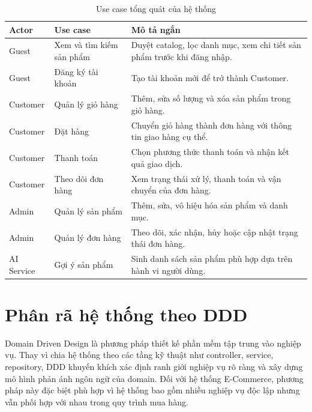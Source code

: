 \documentclass[../main.tex]{subfiles}
\begin{document}
\begin{table}[H]
    \centering
    \caption{Use case tổng quát của hệ thống}
    \label{tab:chapter2-use-cases}
    \begin{tabular}{|p{}|p{}|p{}|}
        \hline
        \rowcolor{primary!35}
        \textbf{Actor} & \textbf{Use case} & \textbf{Mô tả ngắn} \\
        \hline
        Guest & Xem và tìm kiếm sản phẩm & Duyệt catalog, lọc danh mục, xem chi tiết sản phẩm trước khi đăng nhập. \\
        \hline
        Guest & Đăng ký tài khoản & Tạo tài khoản mới để trở thành Customer. \\
        \hline
        Customer & Quản lý giỏ hàng & Thêm, sửa số lượng và xóa sản phẩm trong giỏ hàng. \\
        \hline
        Customer & Đặt hàng & Chuyển giỏ hàng thành đơn hàng với thông tin giao hàng cụ thể. \\
        \hline
        Customer & Thanh toán & Chọn phương thức thanh toán và nhận kết quả giao dịch. \\
        \hline
        Customer & Theo dõi đơn hàng & Xem trạng thái xử lý, thanh toán và vận chuyển của đơn hàng. \\
        \hline
        Admin & Quản lý sản phẩm & Thêm, sửa, vô hiệu hóa sản phẩm và danh mục. \\
        \hline
        Admin & Quản lý đơn hàng & Theo dõi, xác nhận, hủy hoặc cập nhật trạng thái đơn hàng. \\
        \hline
        AI Service & Gợi ý sản phẩm & Sinh danh sách sản phẩm phù hợp dựa trên hành vi người dùng. \\
        \hline
    \end{tabular}
\end{table}

\section{Phân rã hệ thống theo DDD}
\label{section:2.2}

Domain Driven Design là phương pháp thiết kế phần mềm tập trung vào nghiệp vụ. Thay vì chia hệ thống theo các tầng kỹ thuật như controller, service, repository, DDD khuyến khích xác định ranh giới nghiệp vụ rõ ràng và xây dựng mô hình phản ánh ngôn ngữ của domain. Đối với hệ thống E-Commerce, phương pháp này đặc biệt phù hợp vì hệ thống bao gồm nhiều nghiệp vụ độc lập nhưng vẫn phối hợp với nhau trong quy trình mua hàng.
\end{document}
